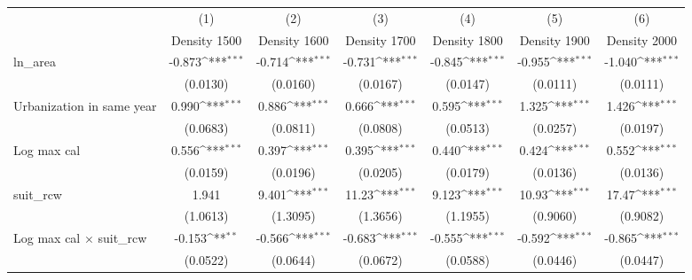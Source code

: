 {
\def\sym#1{\ifmmode^{#1}\else\(^{#1}\)\fi}
\begin{tabular}{l*{6}{c}}
\toprule
                    &\multicolumn{1}{c}{(1)}&\multicolumn{1}{c}{(2)}&\multicolumn{1}{c}{(3)}&\multicolumn{1}{c}{(4)}&\multicolumn{1}{c}{(5)}&\multicolumn{1}{c}{(6)}\\
                    &\multicolumn{1}{c}{Density 1500}&\multicolumn{1}{c}{Density 1600}&\multicolumn{1}{c}{Density 1700}&\multicolumn{1}{c}{Density 1800}&\multicolumn{1}{c}{Density 1900}&\multicolumn{1}{c}{Density 2000}\\
\midrule
ln\_area             &      -0.873\sym{***}&      -0.714\sym{***}&      -0.731\sym{***}&      -0.845\sym{***}&      -0.955\sym{***}&      -1.040\sym{***}\\
                    &    (0.0130)         &    (0.0160)         &    (0.0167)         &    (0.0147)         &    (0.0111)         &    (0.0111)         \\
\addlinespace
Urbanization in same year&       0.990\sym{***}&       0.886\sym{***}&       0.666\sym{***}&       0.595\sym{***}&       1.325\sym{***}&       1.426\sym{***}\\
                    &    (0.0683)         &    (0.0811)         &    (0.0808)         &    (0.0513)         &    (0.0257)         &    (0.0197)         \\
\addlinespace
Log max cal         &       0.556\sym{***}&       0.397\sym{***}&       0.395\sym{***}&       0.440\sym{***}&       0.424\sym{***}&       0.552\sym{***}\\
                    &    (0.0159)         &    (0.0196)         &    (0.0205)         &    (0.0179)         &    (0.0136)         &    (0.0136)         \\
\addlinespace
suit\_rcw            &       1.941         &       9.401\sym{***}&       11.23\sym{***}&       9.123\sym{***}&       10.93\sym{***}&       17.47\sym{***}\\
                    &    (1.0613)         &    (1.3095)         &    (1.3656)         &    (1.1955)         &    (0.9060)         &    (0.9082)         \\
\addlinespace
Log max cal $\times$ suit\_rcw&      -0.153\sym{**} &      -0.566\sym{***}&      -0.683\sym{***}&      -0.555\sym{***}&      -0.592\sym{***}&      -0.865\sym{***}\\
                    &    (0.0522)         &    (0.0644)         &    (0.0672)         &    (0.0588)         &    (0.0446)         &    (0.0447)         \\

\end{tabular}}
